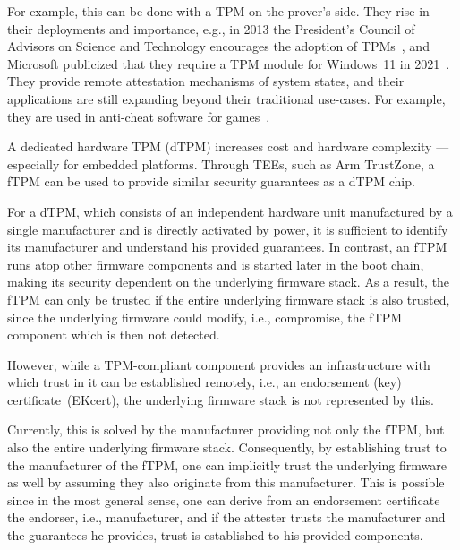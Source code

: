 
For example, this can be done with a \ac{TPM} on the prover's side. They rise in their deployments and importance, e.g., in 2013 the President's Council of Advisors on Science and Technology encourages the adoption of TPMs~\cite{usa}, and Microsoft publicized that they require a TPM module for Windows~11 in 2021~\cite{win11req}.
They provide remote attestation mechanisms of system states, and their applications are still expanding beyond their traditional use-cases. For example, they are used in anti-cheat software for games~\cite{valorant}.


A dedicated hardware TPM (dTPM) increases cost and hardware complexity --- especially for embedded platforms.
Through \acp{TEE}, such as Arm TrustZone, a \ac{fTPM} can be used to provide similar security guarantees as a dTPM chip.


For a dTPM, which consists of an independent hardware unit manufactured by a single manufacturer and is directly activated by power, it is sufficient to identify its manufacturer and understand his provided guarantees.
In contrast, an \ac{fTPM} runs atop other firmware components and is started later in the boot chain, making its security dependent on the underlying firmware stack.
As a result, the fTPM can only be trusted if the entire underlying firmware stack is also trusted, since the underlying firmware could modify, i.e., compromise, the fTPM component which is then not detected.


However, while a TPM-compliant component provides an infrastructure with which trust in it can be established remotely, i.e., an endorsement (key) certificate~(EKcert), the underlying firmware stack is not represented by this.


Currently, this is solved by the manufacturer providing not only the fTPM, but also the entire underlying firmware stack.
Consequently, by establishing trust to the manufacturer of the fTPM, one can implicitly trust the underlying firmware as well by assuming they also originate from this manufacturer.
This is possible since in the most general sense, one can derive from an endorsement certificate the endorser, i.e., manufacturer, and if the attester trusts the manufacturer and the guarantees he provides, trust is established to his provided components.

